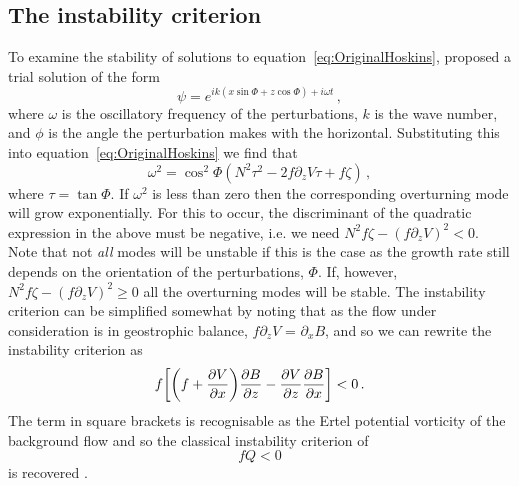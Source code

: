     \subsection{The instability criterion}
    \label{subsec:InstabilityCriterion}
    To examine the stability of solutions to equation~\ref{eq:OriginalHoskins}, \citet{Hoskins1974} proposed a trial solution of the form
    \begin{equation}
        \psi = e^{i k(x\sin\Phi + z\cos \Phi) + i \omega t} \, ,    
    \end{equation}
    where $\omega$ is the oscillatory frequency of the perturbations, $k$ is the wave number, and $\phi$ is the angle the perturbation makes with the horizontal. Substituting this into equation~\ref{eq:OriginalHoskins} we find that
    \begin{equation}
        \label{eq:GrowthRate}
        \omega^2 = \cos^2\Phi (N^2 \tau^2 - 2f\partial_zV\tau + f\zeta) \, ,
    \end{equation}
    where $\tau = \tan\Phi$. If $\omega^2$ is less than zero then the corresponding overturning mode will grow exponentially. For this to occur, the discriminant of the quadratic expression in the above must be negative, i.e. we need $N^2 f \zeta - (f\partial_z V)^2 < 0$. Note that not \textit{all} modes will be unstable if this is the case as the growth rate still depends on the orientation of the perturbations, $\Phi$. If, however, $N^2 f \zeta - (f\partial_z V)^2 \geq 0$ all the overturning modes will be stable. The instability criterion can be simplified somewhat by noting that as the flow under consideration is in geostrophic balance, $f\partial_zV$ = $\partial_x B$, and so we can rewrite the instability criterion as
    \begin{equation}
        f \bigg[\bigg(f + \pdv{V}{x}\bigg)\pdv{B}{z} - \pdv{V}{z}\pdv{B}{x}\bigg] < 0 \, .
    \end{equation}
    The term in square brackets is recognisable as the Ertel potential vorticity of the background flow \citep{Ertel1942} and so the classical instability criterion of
    \begin{equation}
        f Q < 0
    \end{equation}
    is recovered \citep{Hoskins1974}.

